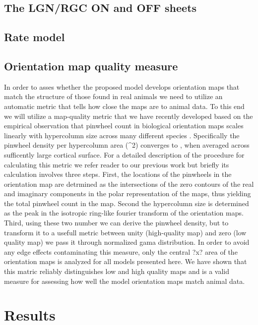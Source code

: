 \documentclass[a4paper,10pt]{article}
\begin{document}
\subsection{The LGN/RGC ON and OFF sheets}



\subsection{Rate model}

\subsection{Orientation map quality measure}

In order to asses whether the proposed model develops orientation maps that match the structure of those found in real 
animals we need to utilize an automatic metric that tells how close the maps are to animal data. To this end we will 
utilize a map-quality metric that we have recently developed \cite{Stevens2013} based on the empirical observation that pinwheel count 
in biological orientation maps scales linearly with hypercolumn size across many different species \cite{Kaschube2010}.
Specifically the pinwheel density per hypercolumn area (\Lambda^2) converges to \pi, when averaged across sufficently 
large cortical surface. For a detailed description of the procedure for calculating this metric we refer reader to 
our previous work \cite{Stevens2013} but briefly its calculation involves three steps. First, the locations of the pinwheels
in the orientation map are detrmined as the intersections of the zero contours of the real and imaginary 
components in the polar representation of the maps, thus yielding the total pinwheel count in the map. Second the 
hypercolumn size is determined as the peak in the isotropic ring-like fourier transform of the orientation maps.
Third, using these two number we can derive the pinwheel density, but to transform it to a usefull metric between 
unity (high-quality map) and zero (low quality map) we pass it through normalized gama distribution. In order to 
avoid any edge effects contaminating this measure, only the central ?x? area of the orientation maps is analyzed for
all models presented here. We have shown that this matric reliably distinguishes low and high quality maps \cite{Stevens2013}
and is a valid measure for assessing how well the model orientation maps match animal data.

\section{Results}
\end{document}
